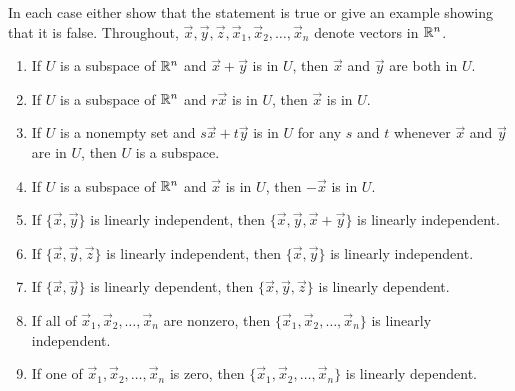 \documentclass{ximera}
\begin{document}
\begin{problem}
In each case either show that the statement is true or give an example showing that it is false. Throughout, $\vec{x}, \vec{y}, \vec{z}, \vec{x}_{1}, \vec{x}_{2}, \dots, \vec{x}_{n}$ denote vectors in $\mathbb{R}^n$.

\begin{enumerate}
\item If $U$ is a subspace of $\mathbb{R}^n$ and $\vec{x} + \vec{y}$ is in $U$, then $\vec{x}$ and $\vec{y}$ are both in $U$.

\item If $U$ is a subspace of $\mathbb{R}^n$ and $r\vec{x}$ is in $U$, then $\vec{x}$ is in $U$.

\item If $U$ is a nonempty set and $s\vec{x} + t\vec{y}$ is in $U$ for any $s$ and $t$ whenever $\vec{x}$ and $\vec{y}$ are in $U$, then $U$ is a subspace.

\item If $U$ is a subspace of $\mathbb{R}^n$ and $\vec{x}$ is in $U$, then $-\vec{x}$ is in $U$.

\item If $\{\vec{x}, \vec{y}\}$ is linearly independent, then $\{\vec{x}, \vec{y}, \vec{x} + \vec{y}\}$ is linearly independent.

\item If $\{\vec{x}, \vec{y}, \vec{z}\}$ is linearly independent, then $\{\vec{x}, \vec{y}\}$ is linearly independent.

\item If $\{\vec{x}, \vec{y}\}$ is linearly dependent, then $\{\vec{x}, \vec{y}, \vec{z}\}$ is linearly dependent.

\item If all of $\vec{x}_{1}, \vec{x}_{2}, \dots, \vec{x}_{n}$ are nonzero, then $\{\vec{x}_{1}, \vec{x}_{2}, \dots, \vec{x}_{n}\}$ is linearly independent.

\item If one of $\vec{x}_{1}, \vec{x}_{2}, \dots, \vec{x}_{n}$ is zero, then $\{\vec{x}_{1}, \vec{x}_{2}, \dots, \vec{x}_{n}\}$ is linearly dependent.


\end{enumerate}
\end{problem}
\end{document}
